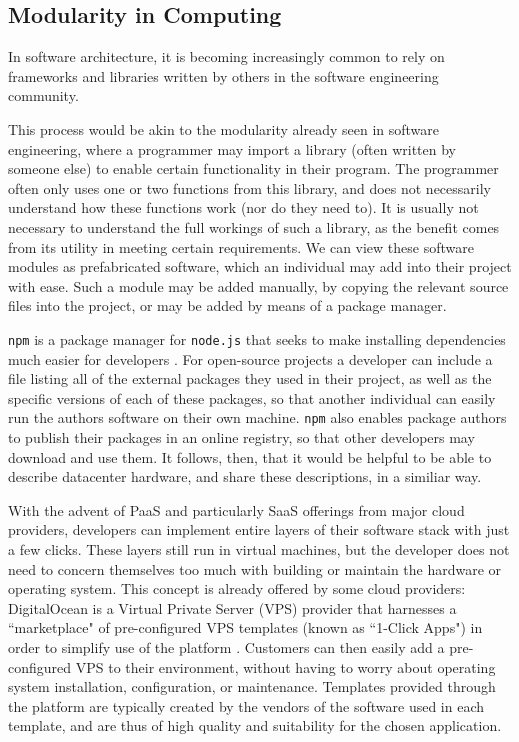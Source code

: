 \documentclass[11pt]{article}
\begin{document}
	
	\subsection{Modularity in Computing}
		In software architecture, it is becoming increasingly common to rely on frameworks and libraries written by others in the software engineering community. 

		This process would be akin to the modularity already seen in software engineering, where a programmer may import a library (often written by someone else) to enable certain functionality in their program. 
		The programmer often only uses one or two functions from this library, and does not necessarily understand how these functions work (nor do they need to).
		It is usually not necessary to understand the full workings of such a library, as the benefit comes from its utility in meeting certain requirements. 
		We can view these software modules as prefabricated software, which an individual may add into their project with ease. 
		Such a module may be added manually, by copying the relevant source files into the project, or may be added by means of a package manager.
		
		\verb|npm| is a package manager for \verb|node.js| that seeks to make installing dependencies much easier for developers \cite{Wittern2016}.
		For open-source projects a developer can include a file listing all of the external packages they used in their project, as well as the specific versions of each of these packages, so that another individual can easily run the authors software on their own machine.
		\verb|npm| also enables package authors to publish their packages in an online registry, so that other developers may download and use them.
		It follows, then, that it would be helpful to be able to describe datacenter hardware, and share these descriptions, in a similiar way. 

		With the advent of PaaS and particularly SaaS offerings from major cloud providers, developers can implement entire layers of their software stack with just a few clicks. 
		These layers still run in virtual machines, but the developer does not need to concern themselves too much with building or maintain the hardware or operating system.
		This concept is already offered by some cloud providers: DigitalOcean is a Virtual Private Server (VPS) provider that harnesses a ``marketplace" of pre-configured VPS templates (known as ``1-Click Apps") in order to simplify use of the platform \cite{DigitalOcean2020}. 
		Customers can then easily add a pre-configured VPS to their environment, without having to worry about operating system installation, configuration, or maintenance. 
		Templates provided through the platform are typically created by the vendors of the software used in each template, and are thus of high quality and suitability for the chosen application.
\end{document}
